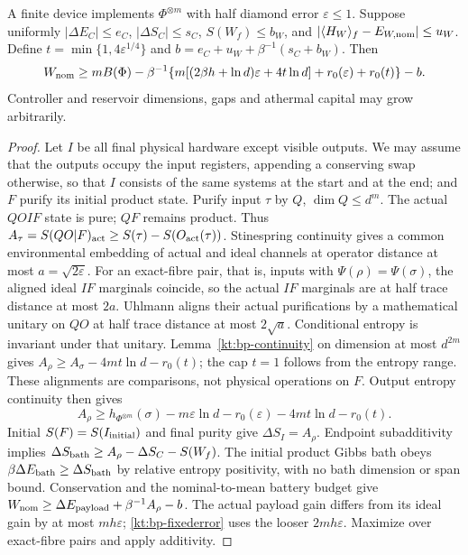 \begin{proposition}\label{kt:bp-lower}
A finite device implements $\Phi^{\otimes m}$ with half diamond error
$\varepsilon\le1$. Suppose uniformly
$|\Delta E_C|\le e_C$, $|\Delta S_C|\le s_C$, $S(W_f)\le b_W$, and
$|\langle H_W\rangle_f-E_{W,\rm nom}|\le u_W$. Define
$t=\min\{1,4\varepsilon^{1/4}\}$ and
$b=e_C+u_W+\beta^{-1}(s_C+b_W)$. Then
\begin{equation}\label{kt:bp-fixederror}
 W_{\rm nom}\ge mB(\Phi)-\beta^{-1}
 \{m[(2\beta h+\ln d)\varepsilon+4t\ln d]+r_0(\varepsilon)+r_0(t)\}-b.
\end{equation}
Controller and reservoir dimensions, gaps and athermal capital may grow
arbitrarily.
\end{proposition}
\begin{proof}
Let $I$ be all final physical hardware except visible outputs. We may assume that the outputs occupy the input registers, appending a conserving swap otherwise, so that $I$ consists of the same systems at the start and at the end; and $F$
purify its initial product state. Purify input $\tau$ by $Q$, $\dim Q\le
d^m$. The actual $QOIF$ state is pure; $QF$ remains product. Thus
$A_\tau=S(QO|F)_{\rm act}\ge S(\tau)-S(O_{\rm act}(\tau))$.
Stinespring continuity \cite[Thm.~1]{KSW08} gives a common environmental
embedding of actual and ideal channels at operator distance at most
$a=\sqrt{2\varepsilon}$. For an exact-fibre pair, that is, inputs with $\Psi(\rho)=\Psi(\sigma)$, the aligned ideal $IF$
marginals coincide, so the actual $IF$ marginals are at half trace
distance at most $2a$. Uhlmann aligns their actual purifications by a
mathematical unitary on $QO$ at half trace distance at most $2\sqrt a$.
Conditional entropy is invariant under that unitary. Lemma~\ref{kt:bp-continuity}
on dimension at most $d^{2m}$ gives
$A_\rho\ge A_\sigma-4mt\ln d-r_0(t)$; the cap $t=1$ follows from
the entropy range. These alignments are comparisons, not physical
operations on $F$. Output entropy continuity then gives
\[
 A_\rho\ge h_{\Phi^{\otimes m}}(\sigma)
       -m\varepsilon\ln d-r_0(\varepsilon)-4mt\ln d-r_0(t).
\]
Initial $S(F)=S(I_{\rm initial})$ and final purity give
$\Delta S_I=A_\rho$. Endpoint subadditivity implies
$\Delta S_{\rm bath}\ge A_\rho-\Delta S_C-S(W_f)$.
The initial product Gibbs bath obeys
$\beta\Delta E_{\rm bath}\ge\Delta S_{\rm bath}$ by relative entropy
positivity, with no bath dimension or span bound. Conservation and
the nominal-to-mean battery budget give
$W_{\rm nom}\ge\Delta E_{\rm payload}+\beta^{-1}A_\rho-b$.
The actual payload gain differs from its ideal gain by at most
$mh\varepsilon$; \eqref{kt:bp-fixederror} uses the looser $2mh\varepsilon$.
Maximize over exact-fibre pairs and apply additivity.
\end{proof}

